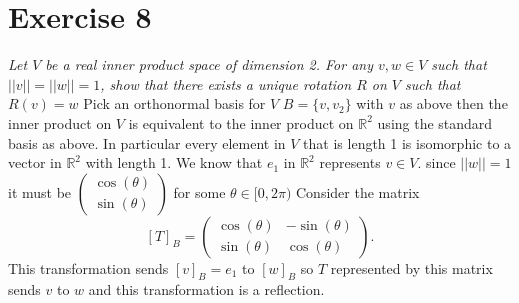 \documentclass{article}
\begin{document}
    \section{Exercise 8}
    \emph{
        Let $V$ be a real inner product space of dimension 2. For any $v,w \in V$ such that 
        $||v|| = ||w|| = 1$, show that there exists a unique rotation $R$ on $V$ such that $R(v) = w$
    }
    Pick an orthonormal basis for $V$ $B = \{v,v_2\}$  with $v$ as above then the inner product on $V$ is equivalent to the 
    inner product on $ \mathbb{R}^2$ using the standard basis as above. In particular every element in $V$ that is
    length 1 is isomorphic to a vector in $ \mathbb{R}^2$ with length 1. We know  that $e_1$ in $ \mathbb{R}^2$ represents $v \in V$.
    since $||w|| = 1$ it must be $ \begin{pmatrix} \cos(\theta) \\ \sin(\theta) \end{pmatrix} $ for some $ \theta \in [0,2\pi)$
    Consider the matrix
    \[
        [T]_B = \begin{pmatrix} \cos(\theta) & -\sin(\theta) \\ \sin(\theta) & \cos(\theta) \end{pmatrix} 
    .\] 
    This transformation sends $[v]_B = e_1$ to $[w]_B$ so  $T$ represented by this matrix sends $v$ to $w$ and 
    this transformation is a reflection.
\end{document}
